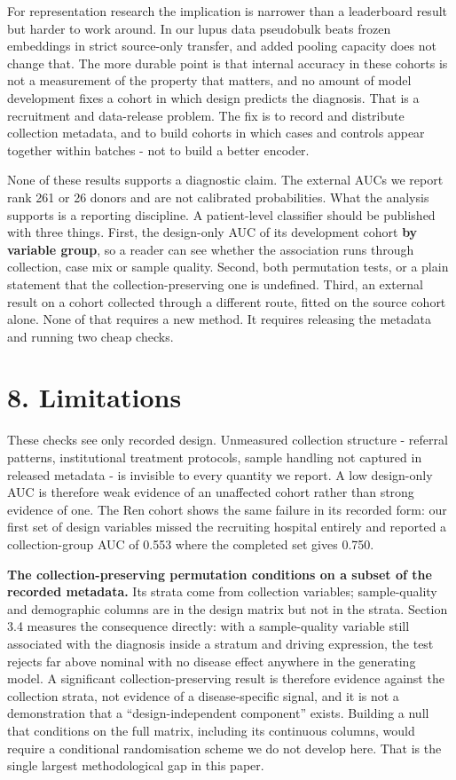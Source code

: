 
For representation research the implication is narrower than a leaderboard result but harder to work around. In our lupus data pseudobulk beats frozen embeddings in strict source-only transfer, and added pooling capacity does not change that. The more durable point is that internal accuracy in these cohorts is not a measurement of the property that matters, and no amount of model development fixes a cohort in which design predicts the diagnosis. That is a recruitment and data-release problem. The fix is to record and distribute collection metadata, and to build cohorts in which cases and controls appear together within batches - not to build a better encoder.

None of these results supports a diagnostic claim. The external AUCs we report rank 261 or 26 donors and are not calibrated probabilities. What the analysis supports is a reporting discipline. A patient-level classifier should be published with three things. First, the design-only AUC of its development cohort \textbf{by variable group}, so a reader can see whether the association runs through collection, case mix or sample quality. Second, both permutation tests, or a plain statement that the collection-preserving one is undefined. Third, an external result on a cohort collected through a different route, fitted on the source cohort alone. None of that requires a new method. It requires releasing the metadata and running two cheap checks.

\section{8. Limitations}\label{limitations}

These checks see only recorded design. Unmeasured collection structure - referral patterns, institutional treatment protocols, sample handling not captured in released metadata - is invisible to every quantity we report. A low design-only AUC is therefore weak evidence of an unaffected cohort rather than strong evidence of one. The Ren cohort shows the same failure in its recorded form: our first set of design variables missed the recruiting hospital entirely and reported a collection-group AUC of 0.553 where the completed set gives 0.750.

\textbf{The collection-preserving permutation conditions on a subset of the recorded metadata.} Its strata come from collection variables; sample-quality and demographic columns are in the design matrix but not in the strata. Section 3.4 measures the consequence directly: with a sample-quality variable still associated with the diagnosis inside a stratum and driving expression, the test rejects far above nominal with no disease effect anywhere in the generating model. A significant collection-preserving result is therefore evidence against the collection strata, not evidence of a disease-specific signal, and it is not a demonstration that a ``design-independent component'' exists. Building a null that conditions on the full matrix, including its continuous columns, would require a conditional randomisation scheme we do not develop here. That is the single largest methodological gap in this paper.

